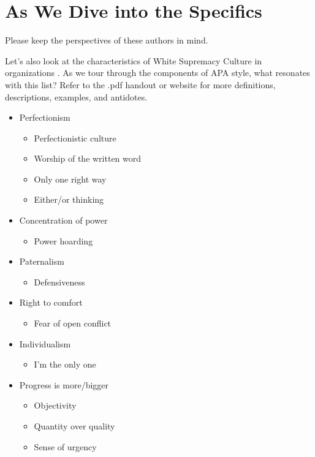 \documentclass[
  11pt,
]{book}
\providecommand{\tightlist}{%
  \setlength{\itemsep}{0pt}\setlength{\parskip}{0pt}}
\begin{document}
\hypertarget{as-we-dive-into-the-specifics}{%
\section{As We Dive into the Specifics}\label{as-we-dive-into-the-specifics}}

Please keep the perspectives of these authors in mind.

Let's also look at the characteristics of White Supremacy Culture in organizations \citep{noauthor_white_nodate}. As we tour through the components of APA style, what resonates with this list? Refer to the .pdf handout or website for more definitions, descriptions, examples, and antidotes.

\begin{itemize}
\tightlist
\item
  Perfectionism

  \begin{itemize}
  \tightlist
  \item
    Perfectionistic culture
  \item
    Worship of the written word
  \item
    Only one right way
  \item
    Either/or thinking
  \end{itemize}
\item
  Concentration of power

  \begin{itemize}
  \tightlist
  \item
    Power hoarding
  \end{itemize}
\item
  Paternalism

  \begin{itemize}
  \tightlist
  \item
    Defensiveness
  \end{itemize}
\item
  Right to comfort

  \begin{itemize}
  \tightlist
  \item
    Fear of open conflict
  \end{itemize}
\item
  Individualism

  \begin{itemize}
  \tightlist
  \item
    I'm the only one
  \end{itemize}
\item
  Progress is more/bigger

  \begin{itemize}
  \tightlist
  \item
    Objectivity
  \item
    Quantity over quality
  \item
    Sense of urgency
  \end{itemize}
\end{itemize}
\end{document}
